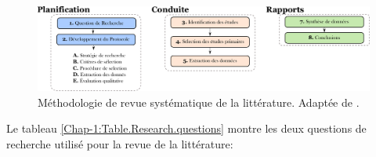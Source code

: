 \begin{figure} [H]
	\centering
	\includegraphics[scale=0.6]{Figures/Francais/SLR-methodology.pdf}
	\caption[]{Méthodologie de revue systématique de la littérature. Adaptée de \parencite{Kitchenham2007}.}
	\label{SLR.methodology}		
\end{figure}
 

Le tableau \ref{Chap-1:Table.Research.questions} montre les deux questions de recherche utilisé pour la revue de la littérature:	

